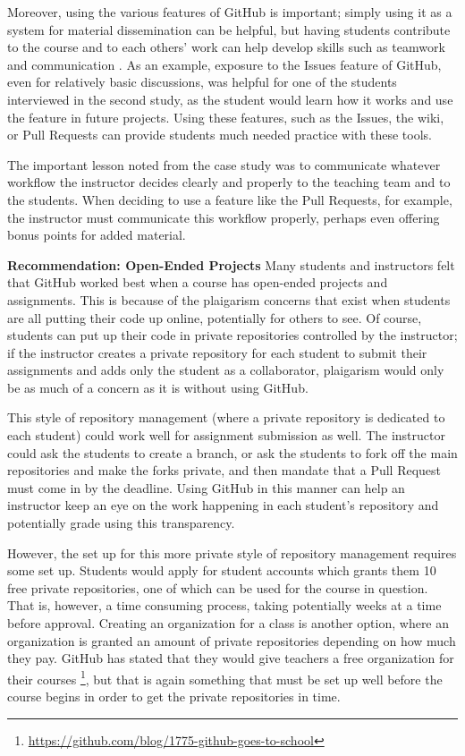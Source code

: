 \begin{itemize}
Moreover, using the various features of GitHub is important; simply using it as a system for material dissemination can be helpful, but having students contribute to the course and to each others' work can help develop skills such as teamwork and communication \cite{hamer2006some}. As an example, exposure to the Issues feature of GitHub, even for relatively basic discussions, was helpful for one of the students interviewed in the second study, as the student would learn how it works and use the feature in future projects. Using these features, such as the Issues, the wiki, or Pull Requests can provide students much needed practice with these tools.

The important lesson noted from the case study was to communicate whatever workflow the instructor decides clearly and properly to the teaching team and to the students. When deciding to use a feature like the Pull Requests, for example, the instructor must communicate this workflow properly, perhaps even offering bonus points for added material.

\textbf{Recommendation: Open-Ended Projects}
Many students and instructors felt that GitHub worked best when a course has open-ended projects and assignments. This is because of the plaigarism concerns that exist when students are all putting their code up online, potentially for others to see. Of course, students can put up their code in private repositories controlled by the instructor; if the instructor creates a private repository for each student to submit their assignments and adds only the student as a collaborator, plaigarism would only be as much of a concern as it is without using GitHub.

This style of repository management (where a private repository is dedicated to each student) could work well for assignment submission as well. The instructor could ask the students to create a branch, or ask the students to fork off the main repositories and make the forks private, and then mandate that a Pull Request must come in by the deadline. Using GitHub in this manner can help an instructor keep an eye on the work happening in each student's repository and potentially grade using this transparency.

However, the set up for this more private style of repository management requires some set up. Students would apply for student accounts which grants them 10 free private repositories, one of which can be used for the course in question. That is, however, a time consuming process, taking potentially weeks at a time before approval. Creating an organization for a class is another option, where an organization is granted an amount of private repositories depending on how much they pay. GitHub has stated that they would give teachers a free organization for their courses \footnote{\url{https://github.com/blog/1775-github-goes-to-school}}, but that is again something that must be set up well before the course begins in order to get the private repositories in time.


\end{itemize}
